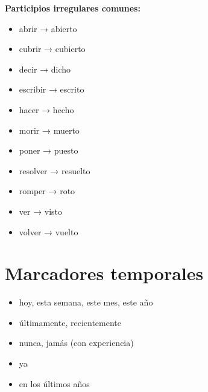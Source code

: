 \documentclass[a4paper,11pt]{article}
\begin{document}
\vspace{0.2cm}

\textbf{Participios irregulares comunes:}

\begin{itemize}

  \item abrir → abierto

  \item cubrir → cubierto

  \item decir → dicho

  \item escribir → escrito

  \item hacer → hecho

  \item morir → muerto

  \item poner → puesto

  \item resolver → resuelto

  \item romper → roto

  \item ver → visto

  \item volver → vuelto

\end{itemize}

\vspace{0.2cm}

\section{Marcadores temporales}

\begin{itemize}

  \item hoy, esta semana, este mes, este año

  \item últimamente, recientemente

  \item nunca, jamás (con experiencia)

  \item ya

  \item en los últimos años

\end{itemize}
\end{document}
